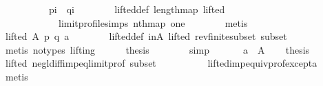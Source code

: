 \begin{isabellebody}
\ \ \ \ \ \ \ \ \ \ {\isacharparenleft}{\kern0pt}{\isacharquery}{\kern0pt}p{\isacharbang}{\kern0pt}i{\isacharparenright}{\kern0pt}\ {\isacharequal}{\kern0pt}\ {\isacharparenleft}{\kern0pt}{\isacharquery}{\kern0pt}q{\isacharbang}{\kern0pt}i{\isacharparenright}{\kern0pt}{\isachardoublequoteclose}\isanewline
\ \ \ \ \ \ \isamarkupfalse%
\ lifted{\isacharunderscore}{\kern0pt}def\ length{\isacharunderscore}{\kern0pt}map\ lifted\isanewline
\ \ \ \ \ \ \ \ \ \ \ \ limit{\isacharunderscore}{\kern0pt}profile{\isachardot}{\kern0pt}simps\ nth{\isacharunderscore}{\kern0pt}map\ one\isanewline
\ \ \ \ \ \ \isamarkupfalse%
\ metis\isanewline
\ \ \ \ \isamarkupfalse%
\ \isamarkupfalse%
\ {\isachardoublequoteopen}lifted\ A\ {\isacharquery}{\kern0pt}p\ {\isacharquery}{\kern0pt}q\ a{\isachardoublequoteclose}\isanewline
\ \ \ \ \ \ \isamarkupfalse%
\ lifted{\isacharunderscore}{\kern0pt}def\ inA\ lifted\ rev{\isacharunderscore}{\kern0pt}finite{\isacharunderscore}{\kern0pt}subset\ subset\isanewline
\ \ \ \ \ \ \isamarkupfalse%
\ {\isacharparenleft}{\kern0pt}metis\ {\isacharparenleft}{\kern0pt}no{\isacharunderscore}{\kern0pt}types{\isacharcomma}{\kern0pt}\ lifting{\isacharparenright}{\kern0pt}{\isacharparenright}{\kern0pt}\isanewline
\ \ \ \ \isamarkupfalse%
\ {\isacharquery}{\kern0pt}thesis\isanewline
\ \ \ \ \ \ \isamarkupfalse%
\ simp\isanewline
\ \ \isamarkupfalse%
\isanewline
{}\isamarkupfalse%
\isanewline
\ \ \isamarkupfalse%
\ {\isachardoublequoteopen}a\ {\isasymnotin}\ A{\isachardoublequoteclose}\isanewline
\ \ \isamarkupfalse%
\ {\isacharquery}{\kern0pt}thesis\isanewline
\ \ \ \ \isamarkupfalse%
\ lifted\ negl{\isacharunderscore}{\kern0pt}diff{\isacharunderscore}{\kern0pt}imp{\isacharunderscore}{\kern0pt}eq{\isacharunderscore}{\kern0pt}limit{\isacharunderscore}{\kern0pt}prof\ subset\isanewline
\ \ \ \ \ \ \ \ \ \ lifted{\isacharunderscore}{\kern0pt}imp{\isacharunderscore}{\kern0pt}equiv{\isacharunderscore}{\kern0pt}prof{\isacharunderscore}{\kern0pt}except{\isacharunderscore}{\kern0pt}a\isanewline
\ \ \ \ \isamarkupfalse%
\ metis\isanewline
{}\isamarkupfalse%
%
\endisatagproof
{\isafoldproof}%
%
\isadelimproof
\isanewline
%
\endisadelimproof
%
\isadelimtheory
\isanewline
%
\endisadelimtheory
%
\isatagtheory
{}\isamarkupfalse%
%
\endisatagtheory
{\isafoldtheory}%
%
\isadelimtheory
%
\endisadelimtheory
%
\end{isabellebody}%
